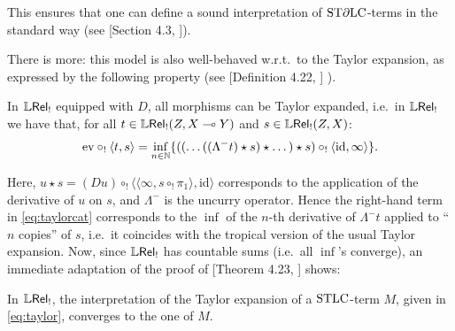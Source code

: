 This ensures that one can define a sound interpretation of $\mathrm{ST}\partial\mathrm{LC}$-terms in the standard way (see [Section 4.3, \cite{Manzo2010}]).

There is more: this model is also well-behaved w.r.t.\ to the Taylor expansion, as expressed by the following property (see [Definition 4.22, \cite{Manzo2012}]%
).

\begin{theorem}\label{thm:modelsTaylor}
 In $\mathbb{L} \mathsf{Rel}_!$ equipped with $D$, all morphisms can be Taylor expanded, i.e.\ in $\mathbb{L} \mathsf{Rel}_!$ we have that, for all
$t\in{\mathbb{L}\mathsf{Rel}_!}(Z,X\multimap Y)$ and $s\in{\mathbb{L}\mathsf{Rel}_!}(Z,X)$:%
 \begin{align}\label{eq:taylorcat}
  \RM{ev}\circ_!\langle t,s\rangle =
  \inf\limits_{n\in\N}
  \set{((\dots((\Lambda^- t)\star s)\star \dots)\star s)\circ_! \langle \RM{id},\infty \rangle}.
 \end{align}
 \end{theorem}
Here,
$u\star s= (Du)\circ_{!} \langle \langle  \infty, s\circ_{!} \pi_{1}\rangle,\mathrm{id}\rangle$ corresponds to the application of the derivative of $u$ on $s$, and $\Lambda^-$ is the uncurry operator.
Hence the right-hand term in \eqref{eq:taylorcat} corresponds to the $\inf$ of the $n$-th derivative of $\Lambda^{-}t$ applied to ``$n$ copies'' of $s$,  i.e.~it coincides with the tropical %
version of the usual Taylor expansion.
Now, since $\mathbb{L} \mathsf{Rel}_!$ has countable sums (i.e.~all $\inf$'s converge), an immediate adaptation of the proof of [Theorem 4.23, \cite{Manzo2012}] shows:

\begin{corollary}\label{cor:T(M)=M}
 In $\mathbb{L} \mathsf{Rel}_!$, the interpretation of the Taylor expansion of a $\mathrm{STLC}$-term $M$, given in \eqref{eq:taylor}, converges to the one of $M$.
\end{corollary}


